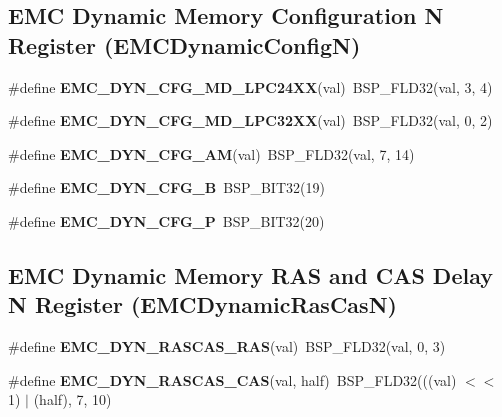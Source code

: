\subsection*{E\+MC Dynamic Memory Configuration N Register (E\+M\+C\+Dynamic\+ConfigN)}
\begin{DoxyCompactItemize}
\item 
\mbox{\label{group__lpc__emc_ga98bd80ad91af782edcdbbf8a8b96b1a0}} 
\#define {\bfseries E\+M\+C\+\_\+\+D\+Y\+N\+\_\+\+C\+F\+G\+\_\+\+M\+D\+\_\+\+L\+P\+C24\+XX}(val)~B\+S\+P\+\_\+\+F\+L\+D32(val, 3, 4)
\item 
\mbox{\label{group__lpc__emc_ga45a73726d8944f6b8e62fe26da03e0f8}} 
\#define {\bfseries E\+M\+C\+\_\+\+D\+Y\+N\+\_\+\+C\+F\+G\+\_\+\+M\+D\+\_\+\+L\+P\+C32\+XX}(val)~B\+S\+P\+\_\+\+F\+L\+D32(val, 0, 2)
\item 
\mbox{\label{group__lpc__emc_gac84d0231be774c15b3bedd2a76b0f6a5}} 
\#define {\bfseries E\+M\+C\+\_\+\+D\+Y\+N\+\_\+\+C\+F\+G\+\_\+\+AM}(val)~B\+S\+P\+\_\+\+F\+L\+D32(val, 7, 14)
\item 
\mbox{\label{group__lpc__emc_ga9849ed99c0af0440ec7f472c6093660b}} 
\#define {\bfseries E\+M\+C\+\_\+\+D\+Y\+N\+\_\+\+C\+F\+G\+\_\+B}~B\+S\+P\+\_\+\+B\+I\+T32(19)
\item 
\mbox{\label{group__lpc__emc_gae2b09936244dfc3bf20b93b0219c2b7d}} 
\#define {\bfseries E\+M\+C\+\_\+\+D\+Y\+N\+\_\+\+C\+F\+G\+\_\+P}~B\+S\+P\+\_\+\+B\+I\+T32(20)
\end{DoxyCompactItemize}
\subsection*{E\+MC Dynamic Memory R\+AS and C\+AS Delay N Register (E\+M\+C\+Dynamic\+Ras\+CasN)}
\begin{DoxyCompactItemize}
\item 
\mbox{\label{group__lpc__emc_ga383b7a2804bed1352ae4fd5b0d485bb1}} 
\#define {\bfseries E\+M\+C\+\_\+\+D\+Y\+N\+\_\+\+R\+A\+S\+C\+A\+S\+\_\+\+R\+AS}(val)~B\+S\+P\+\_\+\+F\+L\+D32(val, 0, 3)
\item 
\mbox{\label{group__lpc__emc_ga2c1a45657fc9b527cfcc03048341f684}} 
\#define {\bfseries E\+M\+C\+\_\+\+D\+Y\+N\+\_\+\+R\+A\+S\+C\+A\+S\+\_\+\+C\+AS}(val,  half)~B\+S\+P\+\_\+\+F\+L\+D32(((val) $<$$<$ 1) $\vert$ (half), 7, 10)
\end{DoxyCompactItemize}
